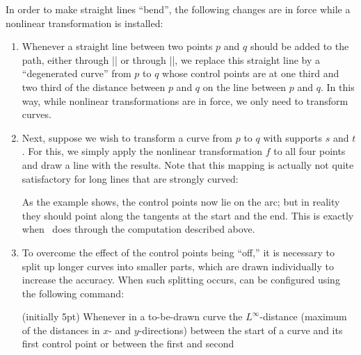 In order to make straight lines ``bend'', the following changes are in force
while a nonlinear transformation is installed:
%
\begin{enumerate}
    \item Whenever a straight line between two points $p$ and $q$ should be
        added to the path, either through |\pgfpathlineto| or through
        |\pgfpathclose|, we replace this straight line by a ``degenerated
        curve'' from $p$ to $q$ whose control points are at one third and two
        third of the distance between $p$ and $q$ on the line between $p$ and
        $q$. In this way, while nonlinear transformations are in force, we only
        need to transform curves.
    \item Next, suppose we wish to transform a curve from $p$ to $q$ with
        supports $s$ and $t$. For this, we simply apply the nonlinear
        transformation $f$ to all four points and draw a line with the results.
        Note that this mapping is actually not quite satisfactory for long
        lines that are strongly curved:
\begin{codeexample}[]
\end{codeexample}
        As the example shows, the control points now lie on the arc; but in
        reality they should point along the tangents at the start and the end.
        This is exactly when \pgfname\ does through the computation described
        above.
    \item To overcome the effect of the control points being ``off,'' it is
        necessary to split up longer curves into smaller parts, which are drawn
        individually to increase the accuracy. When such splitting occurs, can
        be configured using the following command:
        \begin{command}{\pgfsettransformnonlinearflatness{} (initially 5pt)}
            Whenever in a to-be-drawn curve the $L^\infty$-distance (maximum of
            the distances in $x$- and $y$-directions) between the start of a
            curve and its first control point or between the first and second

\end{command}
\end{enumerate}
